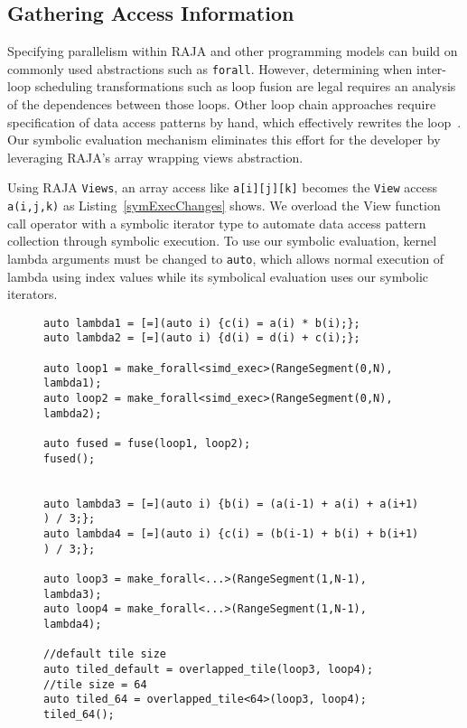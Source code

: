 \subsection{Gathering Access Information}
\label{subsec:accesses}

Specifying parallelism within RAJA and other programming models can
build on commonly used abstractions such as \verb.forall..
However, determining when inter-loop scheduling transformations such as
loop fusion are legal requires an analysis of the dependences between those loops.
Other loop chain approaches require specification of data access patterns by
hand, which effectively rewrites the loop~\cite{Bertolacci2019}.
Our symbolic evaluation mechanism eliminates this effort for the
developer by leveraging RAJA's array wrapping views abstraction.

Using RAJA \verb.Views.,
an array access like \verb.a[i][j][k]. becomes the \verb.View. access \verb.a(i,j,k). as
Listing~\ref{symExecChanges} shows.
We overload the View function call operator with a symbolic iterator type to automate
data access pattern collection through symbolic execution.
To use our symbolic evaluation, kernel lambda arguments must be changed to
\verb.auto., which allows normal execution of lambda using index values while
its symbolical evaluation uses our symbolic iterators.

\begin{figure}[t]
\begin{lstlisting}[caption={Using the \texttt{fuse} and \texttt{overlapped\_tile} transformations.}, label={transformExample}]
auto lambda1 = [=](auto i) {c(i) = a(i) * b(i);};
auto lambda2 = [=](auto i) {d(i) = d(i) + c(i);};

auto loop1 = make_forall<simd_exec>(RangeSegment(0,N), lambda1);
auto loop2 = make_forall<simd_exec>(RangeSegment(0,N), lambda2);

auto fused = fuse(loop1, loop2);
fused();


auto lambda3 = [=](auto i) {b(i) = (a(i-1) + a(i) + a(i+1) ) / 3;};
auto lambda4 = [=](auto i) {c(i) = (b(i-1) + b(i) + b(i+1) ) / 3;};

auto loop3 = make_forall<...>(RangeSegment(1,N-1), lambda3);
auto loop4 = make_forall<...>(RangeSegment(1,N-1), lambda4);

//default tile size
auto tiled_default = overlapped_tile(loop3, loop4);
//tile size = 64
auto tiled_64 = overlapped_tile<64>(loop3, loop4);
tiled_64();
 \end{lstlisting}
\end{figure}


